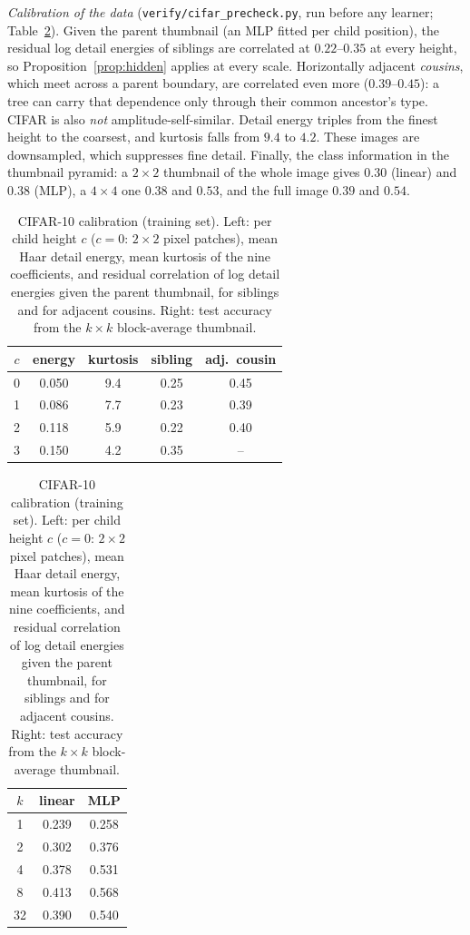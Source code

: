 \documentclass[11pt]{article}
\theoremstyle{definition}
\begin{document}
\emph{Calibration of the data} (\texttt{verify/cifar\_precheck.py}, run before any learner; Table~\ref{tab:cifarcal}).
Given the parent thumbnail (an MLP fitted per child position), the residual log detail energies of siblings
are correlated at $0.22$--$0.35$ at every height, so Proposition~\ref{prop:hidden} applies at every scale.
Horizontally adjacent \emph{cousins}, which meet across a parent boundary, are correlated even more
($0.39$--$0.45$): a tree can carry that dependence only through their common ancestor's type. CIFAR is
also \emph{not} amplitude-self-similar. Detail energy triples from the finest height to the coarsest, and
kurtosis falls from $9.4$ to $4.2$. These images are downsampled, which suppresses fine detail. Finally, the
class information in the thumbnail pyramid: a $2\times2$ thumbnail of the whole image gives $0.30$ (linear)
and $0.38$ (MLP), a $4\times4$ one $0.38$ and $0.53$, and the full image $0.39$ and $0.54$.

\begin{table}[h]\centering
\caption{CIFAR-10 calibration (training set). Left: per child height $c$ ($c=0$: $2\times2$ pixel patches), mean
Haar detail energy, mean kurtosis of the nine coefficients, and residual correlation of log detail energies
given the parent thumbnail, for siblings and for adjacent cousins. Right: test accuracy from the $k\times k$
block-average thumbnail.}\label{tab:cifarcal}
\small\begin{tabular}{c|cccc}\toprule
$c$ & energy & kurtosis & sibling & adj.\ cousin\\\midrule
0 & 0.050 & 9.4 & 0.25 & 0.45\\
1 & 0.086 & 7.7 & 0.23 & 0.39\\
2 & 0.118 & 5.9 & 0.22 & 0.40\\
3 & 0.150 & 4.2 & 0.35 & --\\
\bottomrule\end{tabular}\qquad
\begin{tabular}{c|cc}\toprule
$k$ & linear & MLP\\\midrule
1 & 0.239 & 0.258\\
2 & 0.302 & 0.376\\
4 & 0.378 & 0.531\\
8 & 0.413 & 0.568\\
32 & 0.390 & 0.540\\
\bottomrule\end{tabular}
\end{table}
\end{document}
